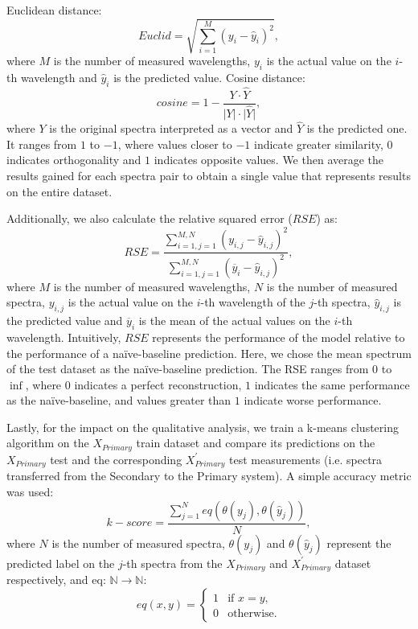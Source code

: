 \documentclass[preprint,11pt]{elsarticle}
\begin{document}
Euclidean distance:
\begin{equation}
    Euclid = \sqrt{\sum_{i=1}^{M}(y_{i} - \hat{y}_{i})^2},
\end{equation}
where $M$ is the number of measured wavelengths, $y_{i}$ is the actual value on the $i$-th wavelength and $\hat{y}_{i}$ is the predicted value.
Cosine distance:
\begin{equation}
    cosine = 1 - \frac{Y \cdot \hat{Y}}{\lvert Y \rvert \cdot \lvert \hat{Y} \rvert},
\end{equation}
where $Y$ is the original spectra interpreted as a vector and $\hat{Y}$ is the predicted one. It ranges from $1$ to $-1$, where values closer to $-1$ indicate greater similarity, $0$ indicates orthogonality and $1$ indicates opposite values. We then average the results gained for each spectra pair to obtain a single value that represents results on the entire dataset.

Additionally, we also calculate the relative squared error ($RSE$) as:
\begin{equation}
    RSE = \frac{\sum_{i=1,j=1}^{M,N} (y_{i,j} - \hat{y}_{i,j})^2}{\sum_{i=1,j=1}^{M,N} (\overline{y}_{i} - \hat{y}_{i,j})^2},
\end{equation}
where $M$ is the number of measured wavelengths, $N$ is the number of measured spectra, $y_{i, j}$ is the actual value on the $i$-th wavelength of the $j$-th spectra, $\hat{y}_{i, j}$ is the predicted value and $\overline{y}_{i}$ is the mean of the actual values on the $i$-th wavelength. Intuitively, $RSE$ represents the performance of the model relative to the performance of a na\"ive-baseline prediction. Here, we chose the mean spectrum of the test dataset as the na\"ive-baseline prediction. The RSE ranges from $0$ to $\inf$, where $0$ indicates a perfect reconstruction, $1$ indicates the same performance as the na\"ive-baseline, and values greater than $1$ indicate worse performance. 

Lastly, for the impact on the qualitative analysis, we train a k-means clustering algorithm on the $X_{Primary}$ train dataset and compare its predictions on the $X_{Primary}$ test and the corresponding $X_{Primary}^{\prime}$ test measurements (i.e. spectra transferred from the Secondary to the Primary system). A simple accuracy metric was used:
\begin{equation}
    k-score = \frac{\sum_{j=1}^{N} eq(\theta(y_{j}), \theta(\hat{y}_{j}))}{N},
\end{equation}
where $N$ is the number of measured spectra, $\theta(y_{j})$ and $\theta(\hat{y}_{j})$ represent the predicted label on the $j$-th spectra from the $X_{Primary}$ and $X_{Primary}^{\prime}$ dataset respectively, and eq: $\mathbb{N} \rightarrow \mathbb{N}$:
\begin{equation}
eq(x, y)=
   \begin{cases}
       1 & \text{if } x = y, \\
       0 & \text{otherwise.}
   \end{cases}
\end{equation}
\end{document}
